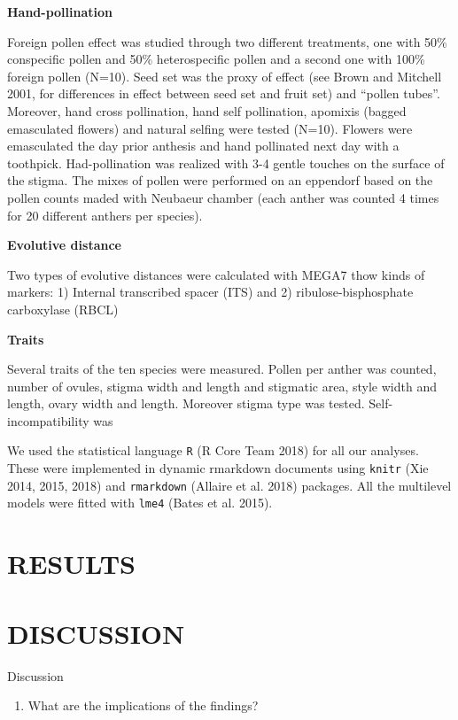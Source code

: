 \documentclass[11pt,a4paper]{article}
\providecommand{\tightlist}{%
  \setlength{\itemsep}{0pt}\setlength{\parskip}{0pt}}
\begin{document}
\textbf{Hand-pollination}

Foreign pollen effect was studied through two different treatments, one
with 50\% conspecific pollen and 50\% heterospecific pollen and a second
one with 100\% foreign pollen (N=10). Seed set was the proxy of effect
(see Brown and Mitchell 2001, for differences in effect between seed set
and fruit set) and ``pollen tubes''. Moreover, hand cross pollination,
hand self pollination, apomixis (bagged emasculated flowers) and natural
selfing were tested (N=10). Flowers were emasculated the day prior
anthesis and hand pollinated next day with a toothpick. Had-pollination
was realized with 3-4 gentle touches on the surface of the stigma. The
mixes of pollen were performed on an eppendorf based on the pollen
counts maded with Neubaeur chamber (each anther was counted 4 times for
20 different anthers per species).

\textbf{Evolutive distance}

Two types of evolutive distances were calculated with MEGA7 thow kinds
of markers: 1) Internal transcribed spacer (ITS) and 2)
ribulose-bisphosphate carboxylase (RBCL)

\textbf{Traits}

Several traits of the ten species were measured. Pollen per anther was
counted, number of ovules, stigma width and length and stigmatic area,
style width and length, ovary width and length. Moreover stigma type was
tested. Self-incompatibility was

We used the statistical language \texttt{R} (R Core Team 2018) for all
our analyses. These were implemented in dynamic rmarkdown documents
using \texttt{knitr} (Xie 2014, 2015, 2018) and \texttt{rmarkdown}
(Allaire et al. 2018) packages. All the multilevel models were fitted
with \texttt{lme4} (Bates et al. 2015).

\section{RESULTS}\label{results}

\section{DISCUSSION}\label{discussion}

Discussion

\begin{enumerate}
\def\labelenumi{\arabic{enumi}.}
\tightlist
\item
  What are the implications of the findings?
\end{enumerate}
\end{document}
